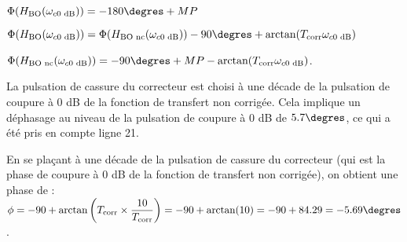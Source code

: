 \ifprof
\begin{corrige}
$\Phi(H_\text{BO}(\omega_{c \text{0 dB}})) = -180\degres + M P$
\end{corrige}
\else
\fi

\ifprof
\begin{corrige}
$\Phi(H_\text{BO}(\omega_{c \text{0 dB}})) = \Phi(H_\text{BO nc}(\omega_{c \text{0 dB}})) - 90\degres + \text{arctan}(T_\text{corr} \omega_{c \text{0 dB}})$
\end{corrige}
\else
\fi

\ifprof
\begin{corrige}
$\Phi(H_\text{BO nc}(\omega_{c \text{0 dB}})) = -90\degres + M P - \text{arctan}(T_\text{corr} \omega_{c \text{0 dB}})$.
\end{corrige}
\else
\fi

\ifprof
\begin{corrige}
La pulsation de cassure du correcteur est choisi à une décade de la pulsation de coupure à $0$ dB de la fonction de transfert non corrigée. Cela implique un déphasage au niveau de la pulsation de coupure à $0$ dB de $5.7\degres$, ce qui a été pris en compte ligne 21.
\end{corrige}
\else
\fi


\ifprof
\begin{corrige}
En se plaçant à une décade de la pulsation de cassure du correcteur (qui est la phase de coupure à $0$ dB de la fonction de transfert non corrigée), on obtient une phase de :
$ \phi = -90 + \text{arctan}\left({T_\text{corr}} \times \dfrac{10}{{T_\text{corr}}}\right) = -90 + \text{arctan}(10) = -90 + 84.29 = -5.69\degres$.
\end{corrige}
\else
\fi

